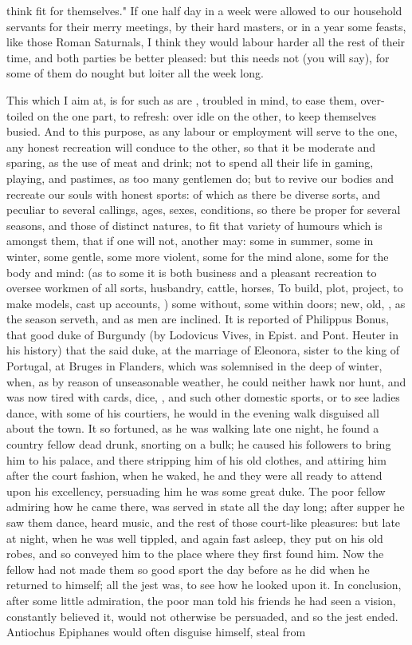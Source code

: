 {think fit for themselves." If one half day in a week were allowed to our household servants for their merry meetings, by their hard masters, or in a year some feasts, like those Roman Saturnals, I think they would labour harder all the rest of their time, and both parties be better pleased: but this needs not (you will say), for some of them do nought but loiter all the week long.

This which I aim at, is for such as are , troubled in mind, to ease them, over-toiled on the one part, to refresh: over idle on the other, to keep themselves busied. And to this purpose, as any labour or employment will serve to the one, any honest recreation will conduce to the other, so that it be moderate and sparing, as the use of meat and drink; not to spend all their life in gaming, playing, and pastimes, as too many gentlemen do; but to revive our bodies and recreate our souls with honest sports: of which as there be diverse sorts, and peculiar to several callings, ages, sexes, conditions, so there be proper for several seasons, and those of distinct natures, to fit that variety of humours which is amongst them, that if one will not, another may: some in summer, some in winter, some gentle, some more violent, some for the mind alone, some for the body and mind: (as to some it is both business and a pleasant recreation to oversee workmen of all sorts, husbandry, cattle, horses, \etc{} To build, plot, project, to make models, cast up accounts, \etc{}) some without, some within doors; new, old, \etc{}, as the season serveth, and as men are inclined. It is reported of Philippus Bonus, that good duke of Burgundy (by Lodovicus Vives, in Epist. and Pont. Heuter in his history) that the said duke, at the marriage of Eleonora, sister to the king of Portugal, at Bruges in Flanders, which was solemnised in the deep of winter, when, as by reason of unseasonable weather, he could neither hawk nor hunt, and was now tired with cards, dice, \etc{}, and such other domestic sports, or to see ladies dance, with some of his courtiers, he would in the evening walk disguised all about the town. It so fortuned, as he was walking late one night, he found a country fellow dead drunk, snorting on a bulk; he caused his followers to bring him to his palace, and there stripping him of his old clothes, and attiring him after the court fashion, when he waked, he and they were all ready to attend upon his excellency, persuading him he was some great duke. The poor fellow admiring how he came there, was served in state all the day long; after supper he saw them dance, heard music, and the rest of those court-like pleasures: but late at night, when he was well tippled, and again fast asleep, they put on his old robes, and so conveyed him to the place where they first found him. Now the fellow had not made them so good sport the day before as he did when he returned to himself; all the jest was, to see how he looked upon it. In conclusion, after some little admiration, the poor man told his friends he had seen a vision, constantly believed it, would not otherwise be persuaded, and so the jest ended. Antiochus Epiphanes would often disguise himself, steal from }
